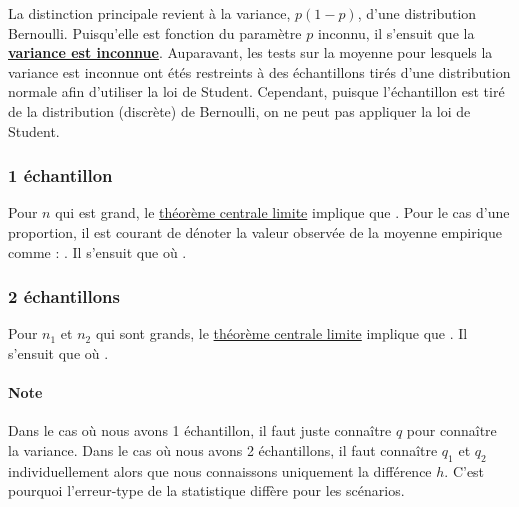 \documentclass[french]{article}
\begin{document}
\begin{multicols*}{2}
\begin{rappel_enhanced}
\bigskip

La distinction principale revient à la variance, $p(1 - p)$, d'une distribution Bernoulli. Puisqu'elle est fonction du paramètre $p$ inconnu, il s'ensuit que la \underline{\textbf{variance est inconnue}}. Auparavant, les tests sur la moyenne pour lesquels la variance est inconnue ont étés restreints à des échantillons tirés d'une distribution normale afin d'utiliser la loi de Student. Cependant, puisque l'échantillon est tiré de la distribution (discrète) de Bernoulli, on ne peut pas appliquer la loi de Student.
\end{rappel_enhanced}


\subsubsection{1 échantillon}\label{subsubsec:PropTests1Sample}
Pour $n$ qui est grand, le \hyperlink{TCLDef}{théorème centrale limite} implique que . Pour le cas d'une proportion, il est courant de dénoter la valeur observée de la moyenne empirique comme : . Il s'ensuit que  où .



\subsubsection{2 échantillons}
Pour $n_{1}$ et $n_{2}$ qui sont grands, le \hyperlink{TCLDef}{théorème centrale limite} implique que . Il s'ensuit que  où .

\paragraph{Note}	Dans le cas où nous avons 1 échantillon, il faut juste connaître $q$ pour connaître la variance. Dans le cas où nous avons 2 échantillons, il faut connaître $q_{1}$ et $q_{2}$ individuellement alors que nous connaissons uniquement la différence $h$. C'est pourquoi l'erreur-type de la statistique diffère pour les scénarios.




\end{multicols*}
\end{document}
